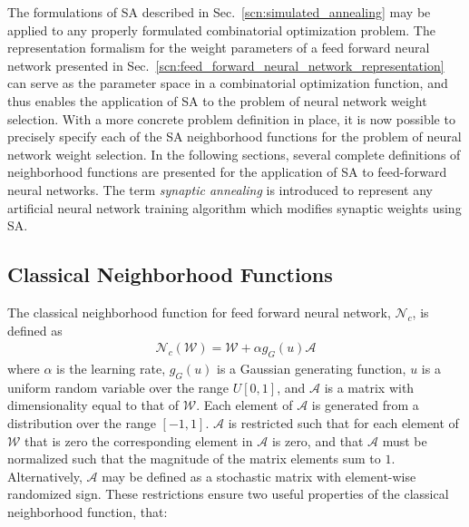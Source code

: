 \documentclass[11pt]{afthesis}
\begin{document}
	The formulations of SA described in Sec.~\ref{scn:simulated_annealing} may be applied to any properly formulated combinatorial optimization problem. The representation formalism for the weight parameters of a feed forward neural network presented in Sec.~\ref{scn:feed_forward_neural_network_representation} can serve as the parameter space in a combinatorial optimization function, and thus enables the application of SA to the problem of neural network weight selection. With a more concrete problem definition in place, it is now possible to precisely specify each of the SA neighborhood functions for the problem of neural network weight selection. In the following sections, several complete definitions of neighborhood functions are presented for the application of SA to feed-forward neural networks. The term \textit{synaptic annealing} is introduced to represent any artificial neural network training algorithm which modifies synaptic weights using SA.
	
	
	\subsection{Classical Neighborhood Functions}
	\label{scn:classical_neighborhood}
	
	The classical neighborhood function for feed forward neural network, \begin{math}\mathcal{N}_{c}\end{math}, is defined as \begin{align}\label{eq:classical_anisotropic_neighborhood}
	\mathcal{N}_{c} (\boldsymbol{\mathcal{W}}) = \boldsymbol{\mathcal{W}} + \alpha g_{G}(u) \boldsymbol{\mathcal{A}} 
	\end{align}
	\noindent where $\alpha$ is the learning rate, $g_{G}(u)$ is a Gaussian generating function, $u$ is a uniform random variable over the range $U[0,1]$, and $\boldsymbol{\mathcal{A}}$ is a matrix with dimensionality equal to that of $\boldsymbol{\mathcal{W}}$. Each element of $\boldsymbol{\mathcal{A}}$ is generated from a distribution over the range $[-1,1]$. $\boldsymbol{\mathcal{A}}$ is restricted such that for each element of $\boldsymbol{\mathcal{W}}$ that is zero the corresponding element in $\boldsymbol{\mathcal{A}}$ is zero, and that $\boldsymbol{\mathcal{A}}$ must be normalized such that the magnitude of the matrix elements sum to $1$. Alternatively, $\boldsymbol{\mathcal{A}}$ may be defined as a stochastic matrix with element-wise randomized sign. These restrictions ensure two useful properties of the classical neighborhood function, that: 
	
\end{document}
